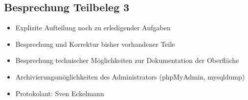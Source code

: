 			\subsection{Besprechung Teilbeleg 3}
			\begin{itemize}
				\item Explizite Aufteilung noch zu erledigender Aufgaben
				\item Besprechung und Korrektur bisher vorhandener Teile
				\item Besprechung technischer Möglichkeiten zur Dokumentation der Oberfläche
				\item Archivierungsmöglichkeiten des Administrators (phpMyAdmin, mysqldump)
			\end{itemize}
		\begin{itemize}
			\item Protokolant: Sven Eckelmann
		\end{itemize}
\newpage
